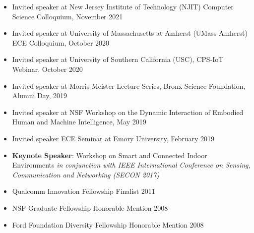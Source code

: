 \documentclass[12pt]{article}
\begin{document}
\begin{itemize}
    \item Invited speaker at New Jersey Institute of Technology (NJIT) Computer Science Colloquium, November 2021
    \item Invited speaker at University of Massachusetts at Amherst (UMass Amherst) ECE Colloquium, October 2020
    \item Invited speaker at University of Southern California (USC), CPS-IoT Webinar, October 2020
    \item Invited speaker at Morris Meister Lecture Series, Bronx Science Foundation, Alumni Day, 2019
    \item Invited speaker at NSF Workshop on the Dynamic Interaction of Embodied Human and Machine Intelligence, May 2019
    \item Invited speaker ECE Seminar at Emory University, February 2019
    \item {\bf Keynote Speaker}: Workshop on Smart and Connected Indoor Environments \emph{in conjunction with IEEE International Conference on Sensing, Communication and Networking (SECON 2017)}
    \item Qualcomm Innovation Fellowship Finalist 2011
    \item NSF Graduate Fellowship Honorable Mention 2008
    \item Ford Foundation Diversity Fellowship Honorable Mention 2008
\end{itemize}
\end{document}
